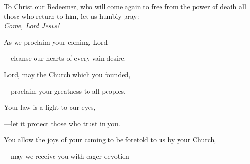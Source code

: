 \intercessions\indent

\begin{hangpar}

To Christ our Redeemer, who will come again to free from the power of death all those who return to him, let us humbly pray:\\
\emph{Come, Lord Jesus!}

\medskip As we proclaim your coming, Lord,

{\color{red}---\thinspace}cleanse our hearts of every vain desire.

\medskip Lord, may the Church which you founded,

{\color{red}---\thinspace}proclaim your greatness to all peoples.

\medskip Your law is a light to our eyes,

{\color{red}---\thinspace}let it protect those who trust in you.

\medskip You allow the joys of your coming to be foretold to us by your Church,

{\color{red}---\thinspace}may we receive you with eager devotion

\end{hangpar}
